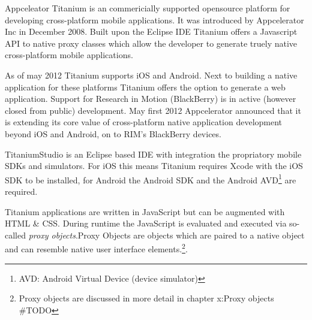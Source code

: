

Appceleator Titanium is an commericially supported opensource platform for developing cross-platform mobile applications. It was introduced by Appcelerator Inc in December 2008. Built upon the Eclipse IDE Titanium offers a Javascript API to native proxy classes which allow the developer to generate truely native cross-platform mobile applications. 

As of may 2012 Titanium supports iOS and Android. Next to building a native application for these platforms Titanium offers the option to generate a web application. 
Support for Research in Motion (BlackBerry) is in active (however closed from public) development. May first 2012 Appcelerator announced that it is extending its core value of cross-platform native application development beyond iOS and Android, on to RIM's BlackBerry devices.\cite{Asher2012}

TitaniumStudio is an Eclipse based IDE with integration the propriatory mobile SDKs and simulators. For iOS this means Titanium requires Xcode with the iOS SDK to be installed, for Android the Android SDK and the Android AVD\footnote{AVD: Android Virtual Device (device simulator)} are required.

Titanium applications are written in JavaScript but can be augmented with HTML \& CSS. During runtime the JavaScript is evaluated and executed via so-called \emph{proxy objects}.Proxy Objects are objects which are paired to a native object and can resemble native user interface elements.\footnote{Proxy objects are discussed in more detail in chapter x:Proxy objects \#TODO}.


